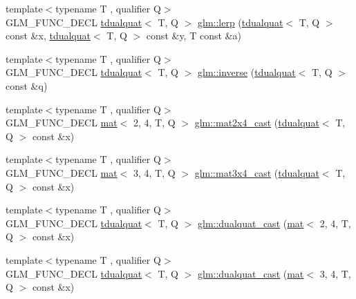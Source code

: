 \begin{DoxyCompactItemize}
\item 
{\footnotesize template$<$typename T , qualifier Q$>$ }\\G\+L\+M\+\_\+\+F\+U\+N\+C\+\_\+\+D\+E\+CL \hyperlink{structglm_1_1tdualquat}{tdualquat}$<$ T, Q $>$ \hyperlink{group__gtx__dual__quaternion_gace8380112d16d33f520839cb35a4d173}{glm\+::lerp} (\hyperlink{structglm_1_1tdualquat}{tdualquat}$<$ T, Q $>$ const \&x, \hyperlink{structglm_1_1tdualquat}{tdualquat}$<$ T, Q $>$ const \&y, T const \&a)
\item 
{\footnotesize template$<$typename T , qualifier Q$>$ }\\G\+L\+M\+\_\+\+F\+U\+N\+C\+\_\+\+D\+E\+CL \hyperlink{structglm_1_1tdualquat}{tdualquat}$<$ T, Q $>$ \hyperlink{group__gtx__dual__quaternion_ga070f521a953f6461af4ab4cf8ccbf27e}{glm\+::inverse} (\hyperlink{structglm_1_1tdualquat}{tdualquat}$<$ T, Q $>$ const \&q)
\item 
{\footnotesize template$<$typename T , qualifier Q$>$ }\\G\+L\+M\+\_\+\+F\+U\+N\+C\+\_\+\+D\+E\+CL \hyperlink{structglm_1_1mat}{mat}$<$ 2, 4, T, Q $>$ \hyperlink{group__gtx__dual__quaternion_gae99d143b37f9cad4cd9285571aab685a}{glm\+::mat2x4\+\_\+cast} (\hyperlink{structglm_1_1tdualquat}{tdualquat}$<$ T, Q $>$ const \&x)
\item 
{\footnotesize template$<$typename T , qualifier Q$>$ }\\G\+L\+M\+\_\+\+F\+U\+N\+C\+\_\+\+D\+E\+CL \hyperlink{structglm_1_1mat}{mat}$<$ 3, 4, T, Q $>$ \hyperlink{group__gtx__dual__quaternion_gaf59f5bb69620d2891c3795c6f2639179}{glm\+::mat3x4\+\_\+cast} (\hyperlink{structglm_1_1tdualquat}{tdualquat}$<$ T, Q $>$ const \&x)
\item 
{\footnotesize template$<$typename T , qualifier Q$>$ }\\G\+L\+M\+\_\+\+F\+U\+N\+C\+\_\+\+D\+E\+CL \hyperlink{structglm_1_1tdualquat}{tdualquat}$<$ T, Q $>$ \hyperlink{group__gtx__dual__quaternion_gac4064ff813759740201765350eac4236}{glm\+::dualquat\+\_\+cast} (\hyperlink{structglm_1_1mat}{mat}$<$ 2, 4, T, Q $>$ const \&x)
\item 
{\footnotesize template$<$typename T , qualifier Q$>$ }\\G\+L\+M\+\_\+\+F\+U\+N\+C\+\_\+\+D\+E\+CL \hyperlink{structglm_1_1tdualquat}{tdualquat}$<$ T, Q $>$ \hyperlink{group__gtx__dual__quaternion_ga91025ebdca0f4ea54da08497b00e8c84}{glm\+::dualquat\+\_\+cast} (\hyperlink{structglm_1_1mat}{mat}$<$ 3, 4, T, Q $>$ const \&x)
\end{DoxyCompactItemize}


